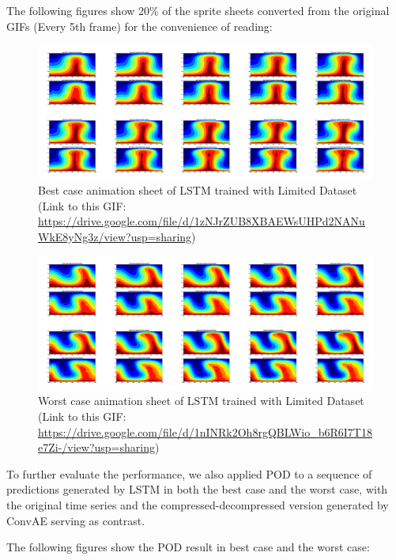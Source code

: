 The following figures show 20\% of the sprite sheets converted from the original GIFs (Every 5th frame) for the convenience of reading:

\begin{figure}[H]
    \centering
    \caption{Best case animation sheet of LSTM trained with Limited Dataset (Link to this GIF: \url{https://drive.google.com/file/d/1zNJrZUB8XBAEWsUHPd2NANuWkE8yNg3z/view?usp=sharing})}
    \includegraphics[scale=0.10]{figures/mantle_convection_images/limited_dataset/LSTM_Best_GIF_sheet.png}
\end{figure}



\begin{figure}[H]
    \centering
    \caption{Worst case animation sheet of LSTM trained with Limited Dataset (Link to this GIF: 
    \url{https://drive.google.com/file/d/1nINRk2Oh8rgQBLWio_b6R6I7T18e7Zi-/view?usp=sharing})}
    \includegraphics[scale=0.10]{figures/mantle_convection_images/limited_dataset/LSTM_Worst_GIF_sheet.png}
\end{figure}

To further evaluate the performance, we also applied POD to a sequence of predictions generated by LSTM in both the best case and the worst case, with the original time series and the compressed-decompressed version generated by ConvAE serving as contrast.

The following figures show the POD result in best case and the worst case:

